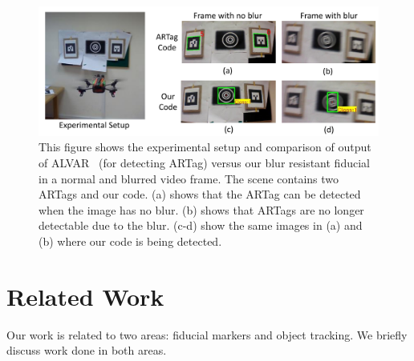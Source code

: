 \documentclass[10pt,twocolumn,letterpaper]{article}
\begin{document}
\begin{figure}
\includegraphics[width=\linewidth]{teaser.pdf}
\caption{This figure shows the experimental setup and comparison of
output of ALVAR~\cite{alvar} (for detecting ARTag) versus our blur resistant
fiducial in a normal and blurred video frame. The scene contains two ARTags and our code.
(a) shows that the ARTag can be detected when the image has no blur.
(b) shows that ARTags are no longer detectable due to the blur.
(c-d) show the same images in (a) and (b) where our code is being detected.}
\label{fig:teaser}
\end{figure}

\section{Related Work}

Our work is related to two areas: fiducial markers and object tracking. We
briefly discuss work done in both areas.
\end{document}
